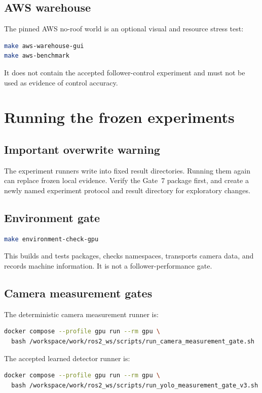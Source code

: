 \documentclass[11pt,oneside,openany]{book}
\begin{document}
\section{AWS warehouse}

The pinned AWS no-roof world is an optional visual and resource stress test:
\begin{lstlisting}[language=bash]
make aws-warehouse-gui
make aws-benchmark
\end{lstlisting}
It does not contain the accepted follower-control experiment and must not be used as evidence of control accuracy.

\chapter{Running the frozen experiments}

\section{Important overwrite warning}

The experiment runners write into fixed result directories. Running them again can replace frozen local evidence. Verify the Gate~7 package first, and create a newly named experiment protocol and result directory for exploratory changes.

\section{Environment gate}

\begin{lstlisting}[language=bash]
make environment-check-gpu
\end{lstlisting}
This builds and tests packages, checks namespaces, transports camera data, and records machine information. It is not a follower-performance gate.

\section{Camera measurement gates}

The deterministic camera measurement runner is:
\begin{lstlisting}[language=bash]
docker compose --profile gpu run --rm gpu \
  bash /workspace/work/ros2_ws/scripts/run_camera_measurement_gate.sh
\end{lstlisting}
The accepted learned detector runner is:
\begin{lstlisting}[language=bash]
docker compose --profile gpu run --rm gpu \
  bash /workspace/work/ros2_ws/scripts/run_yolo_measurement_gate_v3.sh
\end{lstlisting}
\end{document}
